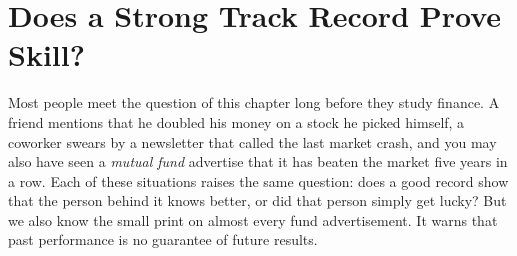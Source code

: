 \providecommand{\term}[1]{\emph{#1}}
\makeatletter
{}
\makeatother

\chapter{Does a Strong Track Record Prove Skill?}
\label{ch:01}

Most people meet the question of this chapter long before they study finance. A friend mentions that he doubled his money on a stock he picked himself, a coworker swears by a newsletter that called the last market crash, and you may also have seen a \term{mutual fund} advertise that it has beaten the market five years in a row.
Each of these situations raises the same question: does a good record show that the person behind it knows better, or did that person simply get lucky? But we also know the small print on almost every fund advertisement. It warns that past performance is no guarantee of future results.

